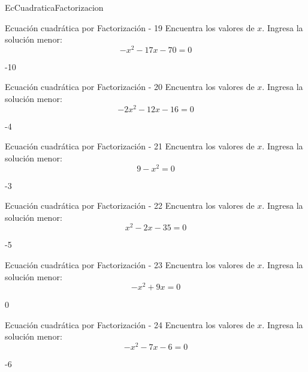 \documentclass[a4,11pt]{aleph-notas}
\begin{document}
\begin{quiz}{EcCuadraticaFactorizacion}
\begin{numerical}[]%
    {Ecuación cuadrática por Factorización - 19}
    Encuentra los valores de $x$. Ingresa la solución menor:
    \[
        - x^{2} - 17 x - 70 = 0
    \]
    \item[] -10
\end{numerical}

\begin{numerical}[]%
    {Ecuación cuadrática por Factorización - 20}
    Encuentra los valores de $x$. Ingresa la solución menor:
    \[
        - 2 x^{2} - 12 x - 16 = 0
    \]
    \item[] -4
\end{numerical}

\begin{numerical}[]%
    {Ecuación cuadrática por Factorización - 21}
    Encuentra los valores de $x$. Ingresa la solución menor:
    \[
        9 - x^{2} = 0
    \]
    \item[] -3
\end{numerical}

\begin{numerical}[]%
    {Ecuación cuadrática por Factorización - 22}
    Encuentra los valores de $x$. Ingresa la solución menor:
    \[
        x^{2} - 2 x - 35 = 0
    \]
    \item[] -5
\end{numerical}

\begin{numerical}[]%
    {Ecuación cuadrática por Factorización - 23}
    Encuentra los valores de $x$. Ingresa la solución menor:
    \[
        - x^{2} + 9 x = 0
    \]
    \item[] 0
\end{numerical}

\begin{numerical}[]%
    {Ecuación cuadrática por Factorización - 24}
    Encuentra los valores de $x$. Ingresa la solución menor:
    \[
        - x^{2} - 7 x - 6 = 0
    \]
    \item[] -6
\end{numerical}


\end{quiz}
\end{document}
